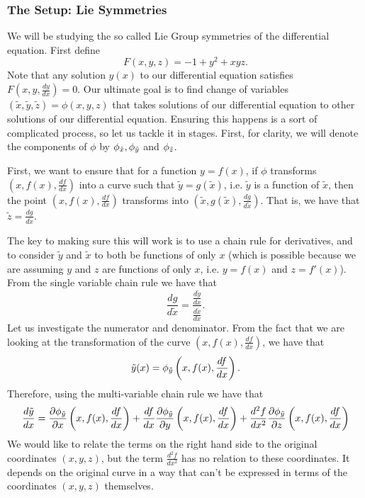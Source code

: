 \subsubsection*{The Setup: Lie Symmetries}

We will be studying the so called Lie Group symmetries of the differential equation. First define
\begin{equation}
F(x, y, z) = -1 + y^2 + xyz.
\end{equation} 
Note that any solution \(y(x)\) to our differential equation satisfies \(F\left(x, y, \frac{dy}{dx}\right) = 0\).
Our ultimate goal is to find change of variables \((\tilde x, \tilde y, \tilde z) = \phi(x, y, z)\) that takes
solutions of our differential equation to other solutions of our differential equation. Ensuring this happens
is a sort of complicated process, so let us tackle it in stages. First, for clarity, we will denote the components
of \(\phi\) by \(\phi_{\tilde x}, \phi_{\tilde y}\) and \(\phi_{\tilde z}\).

First, we want to ensure that for a function \(y = f(x)\), if \(\phi\) transforms \(\left(x, f(x), \frac{df}{dx}\right)\)
into a curve such that \(\tilde y = g(\tilde x)\), i.e. \(\tilde y\) is a function of \(\tilde x\), then the 
point \(\left(x, f(x), \frac{df}{dx}\right)\) 
transforms into \(\left(\tilde x, g(\tilde x), \frac{dg}{d\tilde x}\right)\). That is, we have that
\(\tilde z = \frac{dg}{d\tilde x}\). 

The key to making sure this will work is to use a chain rule for derivatives, and to consider \(\tilde y\) and \(\tilde x\) to both be functions of only \(x\) (which is possible because we are assuming \(y\) and \(z\) are functions
of only \(x\), i.e. \(y = f(x)\) and \(z = f'(x)\)). From the single variable chain rule we have that 
\begin{equation}
\frac{dg}{d\tilde x} = \frac{ \frac{d\tilde y}{dx} } { \frac{d\tilde x}{dx} }.
\end{equation}
Let us investigate the numerator and denominator. From the fact that we are looking at the transformation of 
the curve
\(\left(x, f(x), \frac{df}{dx} \right)\), we have that 
\begin{equation}
\tilde y(x) = \phi_{\tilde y} \left(x, f(x), \frac{df}{dx} \right). 
\end{equation}
Therefore, using the multi-variable chain rule we have that
\begin{equation}
\frac{d\tilde y}{dx} = \frac{\partial \phi_{\tilde y}}{\partial x} \left(x, f(x), \frac{df}{dx} \right) 
    + \frac{df}{dx} \frac{\partial \phi_{\tilde y}}{\partial y} \left(x, f(x), \frac{df}{dx} \right)
    + \frac{d^2f}{dx^2} \frac{\partial \phi_{\tilde y}}{\partial z} \left(x, f(x), \frac{df}{dx} \right)
\end{equation}
We would like to relate the terms on the right hand side to the original coordinates \((x, y, z)\), but the term
\(\frac{d^2 f}{dx^2}\) has no relation to these coordinates. It depends on the original curve in a way that
can't be expressed in terms of the coordinates \((x,y,z)\) themselves. 

